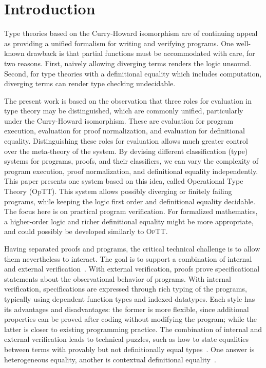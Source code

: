 \documentclass[preprint,natbib]{sigplanconf}
\newcommand{\optt}{\textsc{OpTT}}
\begin{document}
\section{Introduction}

Type theories based on the Curry-Howard isomorphism are of continuing
appeal as providing a unified formalism for writing and verifying
programs.  One well-known drawback is that partial functions must be
accommodated with care, for two reasons.  First, naively allowing
diverging terms renders the logic unsound.  Second, for type theories
with a definitional equality which includes computation, diverging
terms can render type checking undecidable.

The present work is based on the observation that three roles for
evaluation in type theory may be distinguished, which are commonly
unified, particularly under the Curry-Howard isomorphism.  These are
evaluation for program execution, evaluation for proof normalization,
and evaluation for definitional equality.  Distinguishing these roles
for evaluation allows much greater control over the meta-theory of the
system.  By devising different classification (type) systems for
programs, proofs, and their classifiers, we can vary the complexity of
program execution, proof normalization, and definitional equality
independently.  This paper presents one system based on this idea,
called Operational Type Theory (OpTT).  This system allows possibly
diverging or finitely failing programs, while keeping the logic first
order and definitional equality decidable.  The focus here is on
practical program verification.  For formalized mathematics, a
higher-order logic and richer definitional equality might be more
appropriate, and could possibly be developed similarly to \optt.

Having separated proofs and programs, the critical technical challenge
is to allow them nevertheless to interact.  The goal is to support a
combination of internal and external
verification~\cite{alti:esslli96}.  With external verification, proofs
prove specificational statements about the observational behavior of
programs.  With internal verification, specifications are expressed
through rich typing of the programs, typically using dependent
function types and indexed datatypes.  Each style has its advantages
and disadvantages: the former is more flexible, since additional
properties can be proved after coding without modifying the program;
while the latter is closer to existing programming practice.  The
combination of internal and external verification leads to technical
puzzles, such as how to state equalities between terms with provably
but not definitionally equal types~\cite{hofmann+98}.  One answer is
heterogeneous equality, another is contextual definitional
equality~\cite{blanqui+08,mcbride99}.
\end{document}
